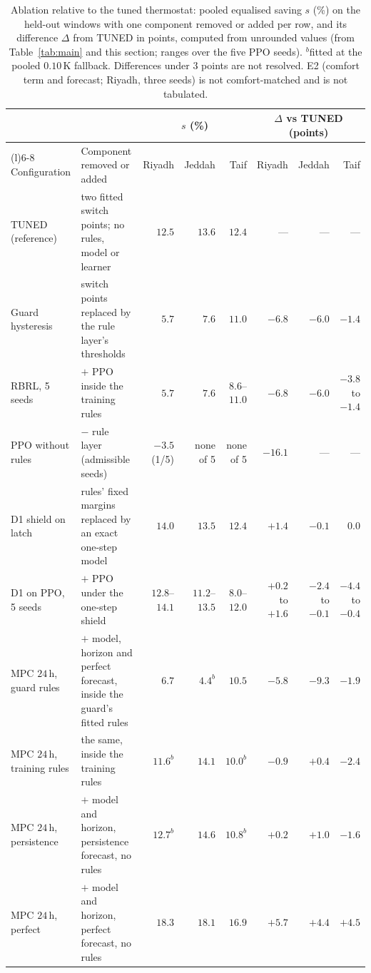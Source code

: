\documentclass[3p,twocolumn,number]{elsarticle}
\begin{document}
\begin{table}[t]
\centering
\caption{Ablation relative to the tuned thermostat: pooled equalised saving
$s$ (\%) on the held-out windows with one component removed or added per row,
and its difference $\Delta$ from TUNED in points, computed from unrounded values
(from Table~\ref{tab:main} and this section; ranges over the five PPO seeds). $^{b}$fitted at the pooled $0.10\,$K fallback.
Differences under $3$ points are not resolved. E2 (comfort term and forecast;
Riyadh, three seeds) is not comfort-matched and is not tabulated.}
\label{tab:ablation}
\setlength{\tabcolsep}{3pt}
\footnotesize
\begin{tabularx}{\textwidth}{@{}>{\raggedright\arraybackslash}p{}>{\raggedright\arraybackslash}Xrrrrrr@{}}
\toprule
 & & \multicolumn{3}{c}{$s$ (\%)} & \multicolumn{3}{c}{$\Delta$ vs TUNED (points)} \\
\cmidrule(lr){3-5}\cmidrule(l){6-8}
Configuration & Component removed or added & Riyadh & Jeddah & Taif & Riyadh & Jeddah & Taif \\
\midrule
TUNED (reference) & two fitted switch points; no rules, model or learner & $12.5$ & $13.6$ & $12.4$ & --- & --- & --- \\
Guard hysteresis & switch points replaced by the rule layer's thresholds & $5.7$ & $7.6$ & $11.0$ & $-6.8$ & $-6.0$ & $-1.4$ \\
RBRL, 5 seeds & $+$ PPO inside the training rules & $5.7$ & $7.6$ & $8.6$--$11.0$ & $-6.8$ & $-6.0$ & $-3.8$ to $-1.4$ \\
PPO without rules & $-$ rule layer (admissible seeds) & $-3.5$ (1/5) & none of 5 & none of 5 & $-16.1$ & --- & --- \\
D1 shield on latch & rules' fixed margins replaced by an exact one-step model & $14.0$ & $13.5$ & $12.4$ & $+1.4$ & $-0.1$ & $0.0$ \\
D1 on PPO, 5 seeds & $+$ PPO under the one-step shield & $12.8$--$14.1$ & $11.2$--$13.5$ & $8.0$--$12.0$ & $+0.2$ to $+1.6$ & $-2.4$ to $-0.1$ & $-4.4$ to $-0.4$ \\
MPC $24\,$h, guard rules & $+$ model, horizon and perfect forecast, inside the guard's fitted rules & $6.7$ & $4.4^{b}$ & $10.5$ & $-5.8$ & $-9.3$ & $-1.9$ \\
MPC $24\,$h, training rules & the same, inside the training rules & $11.6^{b}$ & $14.1$ & $10.0^{b}$ & $-0.9$ & $+0.4$ & $-2.4$ \\
MPC $24\,$h, persistence & $+$ model and horizon, persistence forecast, no rules & $12.7^{b}$ & $14.6$ & $10.8^{b}$ & $+0.2$ & $+1.0$ & $-1.6$ \\
MPC $24\,$h, perfect & $+$ model and horizon, perfect forecast, no rules & $18.3$ & $18.1$ & $16.9$ & $+5.7$ & $+4.4$ & $+4.5$ \\
\bottomrule
\end{tabularx}
\end{table}
\end{document}
